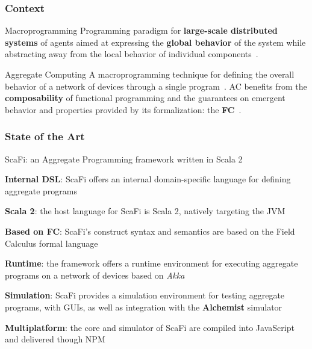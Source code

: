 \begin{frame}
    \titlepage
\end{frame}


\begin{frame}
    \frametitle{Context}
    \begin{block}{Macroprogramming}
        Programming paradigm for \textbf{large-scale distributed systems} of agents aimed at expressing the \textbf{global behavior} of the system while abstracting away from the local behavior of individual components~\cite{macroprogramming-state-of-the-art}.
    \end{block}
    \begin{block}{Aggregate Computing}
        A macroprogramming technique for defining the overall behavior of a network of devices through a single program~\cite{aggregate-programming}.
        \ac{AC} benefits from the \textbf{composability} of functional programming and the guarantees on emergent behavior and properties provided by its formalization: the \textbf{\ac{FC}}~\cite{fc}.
    \end{block}
\end{frame}

\begin{frame}
    \frametitle{State of the Art}
    \begin{blockitems}{ScaFi: an Aggregate Programming framework written in Scala 2}
        \item \textbf{Internal \ac{DSL}}: ScaFi offers an internal domain-specific language for defining aggregate programs~\cite{scafi}
        \item \textbf{Scala 2}: the host language for ScaFi is Scala 2, natively targeting the \ac{JVM}~\cite{scafi-thesis}
        \item \textbf{Based on \ac{FC}}: ScaFi's construct syntax and semantics are based on the Field Calculus formal language
        \item \textbf{Runtime}: the framework offers a runtime environment for executing aggregate programs on a network of devices based on \textit{Akka}
        \item \textbf{Simulation}: ScaFi provides a simulation environment for testing aggregate programs, with \acp{GUI}, as well as integration with the \textbf{Alchemist} simulator~\cite{alchemist,scafi-with-alchemist}
        \item \textbf{Multiplatform}: the core and simulator of ScaFi are compiled into JavaScript and delivered though \ac{NPM}
    \end{blockitems}
\end{frame}

